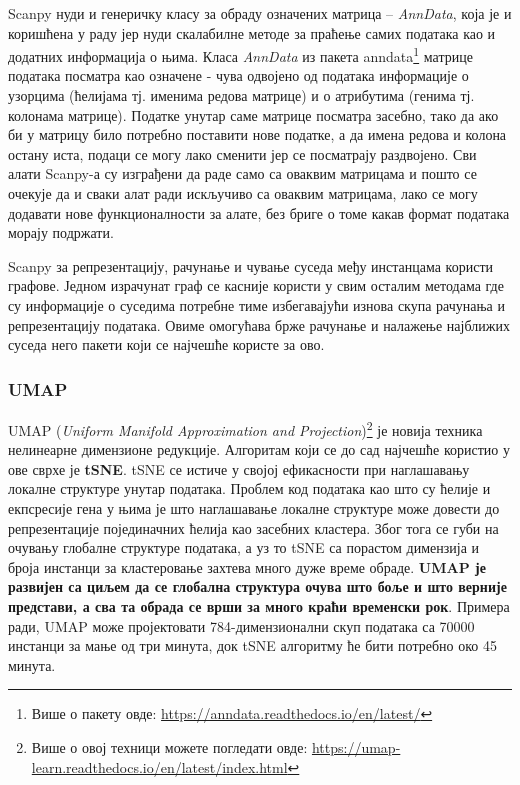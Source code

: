 \documentclass[10pt, a4paper]{article}
\begin{document}
Scanpy нуди и генеричку класу за обраду означених матрица – {\em AnnData}, која је и коришћена у раду јер нуди скалабилне методе за праћење самих података као и додатних информација о њима. Класа {\em AnnData} из пакета anndata\footnote{Више о пакету овде: \url{https://anndata.readthedocs.io/en/latest/}} матрице података посматра као означене - чува одвојено од података информације о узорцима (ћелијама тј. именима редова матрице) и о атрибутима (генима тј. колонама матрице). Податке унутар саме матрице посматра засебно, тако да ако би у матрицу било потребно поставити нове податке, а да имена редова и колона остану иста, подаци се могу лако сменити јер се посматрају раздвојено. Сви алати Scanpy-а су изграђени да раде само са оваквим матрицама и пошто се очекује да и сваки алат ради искључиво са оваквим матрицама, лако се могу додавати нове функционалности за алате, без бриге о томе какав формат података морају подржати.

Scanpy за репрезентацију, рачунање и чување суседа међу инстанцама користи графове. Једном израчунат граф се касније користи у свим осталим методама где су информације о суседима потребне тиме избегавајући изнова скупа рачунања и репрезентацију података. Овиме омогућава брже рачунање и налажење најближих суседа него пакети који се најчешће користе за ово. 

\subsubsection{UMAP}
\label{subsec: podpodnaslov2}

UMAP ({\em Uniform Manifold Approximation and Projection})\footnote{Више о овој техници можете погледати овде: \url{https://umap-learn.readthedocs.io/en/latest/index.html}} је новија техника нелинеарне димензионе редукције. Алгоритам који се до сад најчешће користио у ове сврхе је \textbf{tSNE}. tSNE се истиче у својој ефикасности при наглашавању локалне структуре унутар података. Проблем код података као што су ћелије и екпсресије гена у њима је што наглашавање локалне структуре може довести до репрезентације појединачних ћелија као засебних кластера. Због тога се губи на очувању глобалне структуре података, а уз то tSNE са порастом димензија и броја инстанци за кластеровање захтева много дуже време обраде. \textbf{UMAP је развијен са циљем да се глобална структура очува што боље и што верније представи, а сва та обрада се врши за много краћи временски рок}. Примера ради, UMAP може пројектовати 784-димензионални скуп података са 70000 инстанци за мање од три минута, док tSNE алгоритму ће бити потребно око 45 минута.
\end{document}
